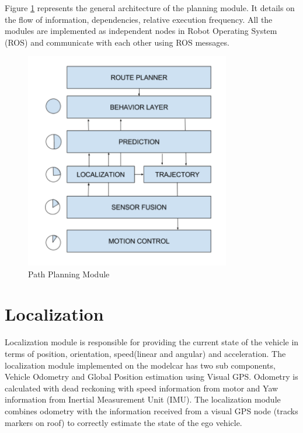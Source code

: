 Figure \ref{path_planner} represents the general architecture of the planning module. It details on the flow of information, dependencies, relative execution frequency. All the modules are implemented as independent nodes in Robot Operating System (ROS) and communicate with each other using ROS messages.
\begin{figure}[h]
    \centering
    \includegraphics[width=0.8\textwidth]{Images/path_planner.png}
    \caption{Path Planning Module}
    \label{path_planner}
\end{figure}

\section{Localization} \label{localization}

Localization module is responsible for providing the current state of the vehicle in terms of position, orientation, speed(linear and angular) and acceleration. The localization module implemented on the modelcar has two sub components, Vehicle Odometry and Global Position estimation using Visual GPS. Odometry is calculated with dead reckoning \cite{dead_reckoning} with speed information from motor and Yaw information from Inertial Measurement Unit (IMU). The localization module combines odometry with the information received from a visual GPS node (tracks markers on roof) to correctly estimate the state of the ego vehicle. 

